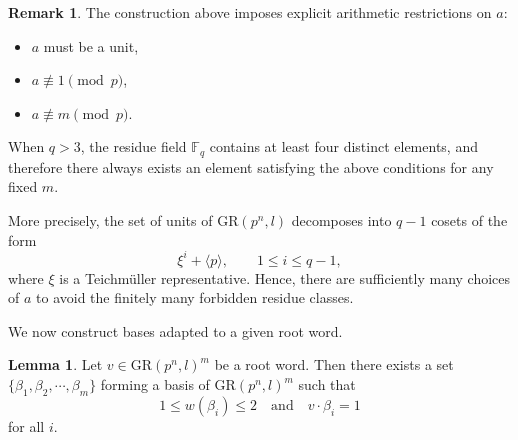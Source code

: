 \documentclass[10pt]{article}
\theoremstyle{definition}
\newtheorem{lemma}[lem]{Lemma}
\newtheorem{remark}[lem]{Remark}
\begin{document}
\begin{remark}
The construction above imposes explicit arithmetic restrictions on $a$:

\begin{itemize}
\item $a$ must be a unit,
\item $a \not\equiv 1 \pmod p$,
\item $a \not\equiv m \pmod p$.
\end{itemize}

When $q>3$, the residue field $\mathbb{F}_q$ contains at least four distinct elements, and therefore there always exists an element satisfying the above conditions for any fixed $m$.

More precisely, the set of units of $\mathrm{GR}(p^n,l)$ decomposes into $q-1$ cosets of the form
\[
\xi^i + \langle p \rangle, \qquad 1\leq i\leq q-1,
\]
where $\xi$ is a Teichmüller representative. Hence, there are sufficiently many choices of $a$ to avoid the finitely many forbidden residue classes.
\end{remark}

We now construct bases adapted to a given root word.

\begin{lemma}\label{Lemma 20}
Let $v\in \mathrm{GR}(p^n,l)^m$ be a root word. Then there exists a set
$\{\beta_1,\beta_2,\cdots,\beta_m\}$ forming a basis of $\mathrm{GR}(p^n,l)^m$ such that
\[
1\leq w(\beta_i)\leq 2
\quad \text{and} \quad
v\cdot \beta_i=1
\]
for all $i$.
\end{lemma}
\end{document}
